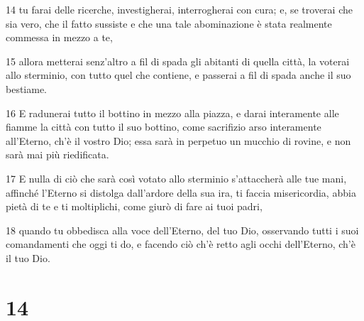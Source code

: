\par 14 tu farai delle ricerche, investigherai, interrogherai con cura; e, se troverai che sia vero, che il fatto sussiste e che una tale abominazione è stata realmente commessa in mezzo a te,
\par 15 allora metterai senz'altro a fil di spada gli abitanti di quella città, la voterai allo sterminio, con tutto quel che contiene, e passerai a fil di spada anche il suo bestiame.
\par 16 E radunerai tutto il bottino in mezzo alla piazza, e darai interamente alle fiamme la città con tutto il suo bottino, come sacrifizio arso interamente all'Eterno, ch'è il vostro Dio; essa sarà in perpetuo un mucchio di rovine, e non sarà mai più riedificata.
\par 17 E nulla di ciò che sarà così votato allo sterminio s'attaccherà alle tue mani, affinché l'Eterno si distolga dall'ardore della sua ira, ti faccia misericordia, abbia pietà di te e ti moltiplichi, come giurò di fare ai tuoi padri,
\par 18 quando tu obbedisca alla voce dell'Eterno, del tuo Dio, osservando tutti i suoi comandamenti che oggi ti do, e facendo ciò ch'è retto agli occhi dell'Eterno, ch'è il tuo Dio.

\chapter{14}

